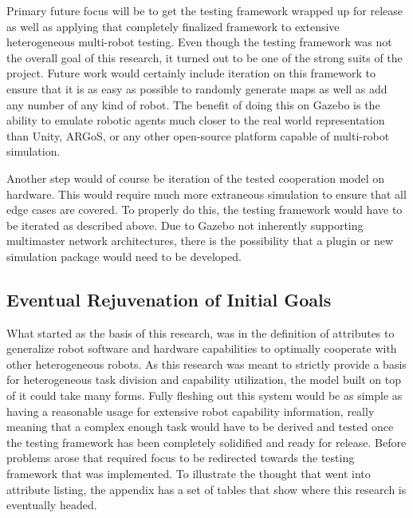 Primary future focus will be to get the testing framework wrapped up
for release as well as applying that completely finalized framework to
extensive heterogeneous multi-robot testing. Even though the testing framework
was not the overall goal of this research,
it turned out to be one of the strong suits of the project. Future work would certainly
include iteration on this framework to ensure that it is as easy as possible to
randomly generate maps as well as add any number of any kind of robot. The benefit
of doing this on Gazebo is the ability to emulate robotic agents much closer to the
real world representation than Unity, ARGoS, or any other open-source platform
capable of multi-robot simulation.

Another step would of course be iteration of the tested cooperation model on hardware.
This would require much more extraneous simulation to ensure that all edge cases are
covered. To properly do this, the testing framework would have to be iterated as
described above. Due to Gazebo not inherently supporting multimaster network architectures,
there is the possibility that a plugin or new simulation package would need to be
developed.

\subsection{Eventual Rejuvenation of Initial Goals}

What started as the basis of this research, was in the definition of attributes
to generalize robot software and hardware capabilities to optimally cooperate with
other heterogeneous robots. As this research was meant to strictly provide a basis
for heterogeneous task division and capability utilization, the model built on
top of it could take many forms. Fully fleshing out this system would be as simple as
having a reasonable usage for extensive robot capability information, really meaning that a
complex enough task would have to be derived and tested once the testing framework has been
completely solidified and ready for release. Before problems arose that required focus to
be redirected towards the testing framework that was implemented. To illustrate the thought
that went into attribute listing, the appendix has a set of tables that show where this
research is eventually headed.
